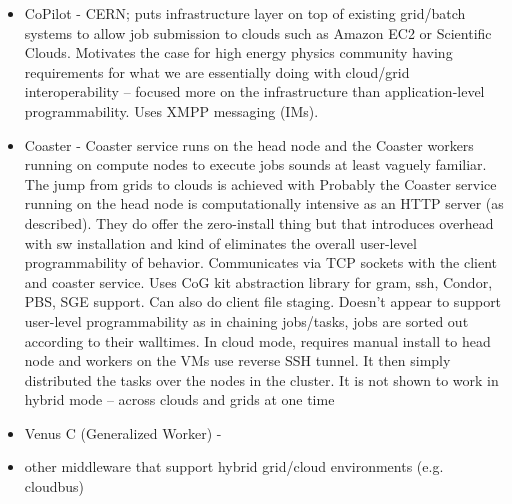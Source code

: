 \documentclass[times]{cpeauth}
\begin{document}
\begin{itemize}

       \item CoPilot - CERN; puts infrastructure layer on top of existing grid/batch systems to allow job submission to clouds such as Amazon EC2 or Scientific Clouds. Motivates the case for high energy physics community having requirements for what we are essentially doing with cloud/grid interoperability -- focused more on the infrastructure than application-level programmability. Uses XMPP messaging (IMs). 
	\item Coaster - Coaster service runs on the head node and the Coaster workers running on compute nodes to execute jobs sounds at least vaguely familiar. The jump from grids to clouds is achieved with  Probably the Coaster service running on the head node is computationally intensive as an  HTTP server (as described). They do offer the zero-install thing but that introduces overhead with sw installation and kind of eliminates the overall user-level programmability of behavior. Communicates via TCP sockets with the client and coaster service. Uses CoG kit abstraction library for gram, ssh, Condor, PBS, SGE support. Can also do client file staging. Doesn't appear to support user-level programmability as in chaining jobs/tasks, jobs are sorted out according to their walltimes. In cloud mode, requires manual install to head node and workers on the VMs use reverse SSH tunnel. It then simply distributed the tasks over the nodes in the cluster. It is not shown to work in hybrid mode -- across clouds and grids at one time
	\item Venus C (Generalized Worker) - 
	\item other middleware that support hybrid grid/cloud environments (e.g. cloudbus)
\end{itemize}
\end{document}
